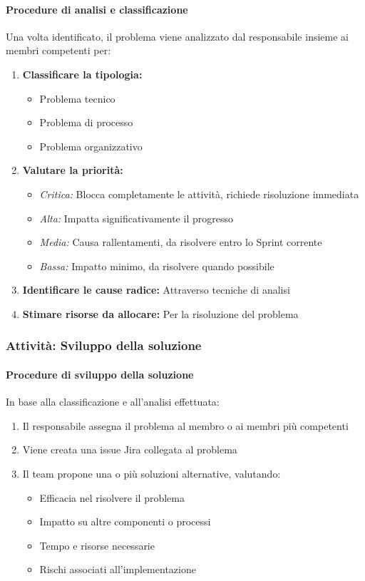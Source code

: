 \documentclass[a4paper,12pt]{article}
\begin{document}
\paragraph{Procedure di analisi e classificazione}
Una volta identificato, il problema viene analizzato dal responsabile insieme ai membri competenti per:
\begin{enumerate}
    \item \textbf{Classificare la tipologia:} 
    \begin{itemize}
        \item Problema tecnico 
        \item Problema di processo 
        \item Problema organizzativo 
    \end{itemize}
    \item \textbf{Valutare la priorità:}
    \begin{itemize}
        \item \textit{Critica:} Blocca completamente le attività, richiede risoluzione immediata
        \item \textit{Alta:} Impatta significativamente il progresso
        \item \textit{Media:} Causa rallentamenti, da risolvere entro lo Sprint corrente
        \item \textit{Bassa:} Impatto minimo, da risolvere quando possibile
    \end{itemize}
    \item \textbf{Identificare le cause radice:} Attraverso tecniche di analisi
    \item \textbf{Stimare risorse da allocare:} Per la risoluzione del problema
\end{enumerate}

\subsubsection{Attività: Sviluppo della soluzione}\label{sviluppo_soluzione}

\paragraph{Procedure di sviluppo della soluzione}
In base alla classificazione e all'analisi effettuata:
\begin{enumerate}
    \item Il responsabile assegna il problema al membro o ai membri più competenti
    \item Viene creata una issue Jira collegata al problema
    \item Il team propone una o più soluzioni alternative, valutando:
    \begin{itemize}
        \item Efficacia nel risolvere il problema
        \item Impatto su altre componenti o processi
        \item Tempo e risorse necessarie
        \item Rischi associati all'implementazione
    \end{itemize}
\end{enumerate}
\end{document}
